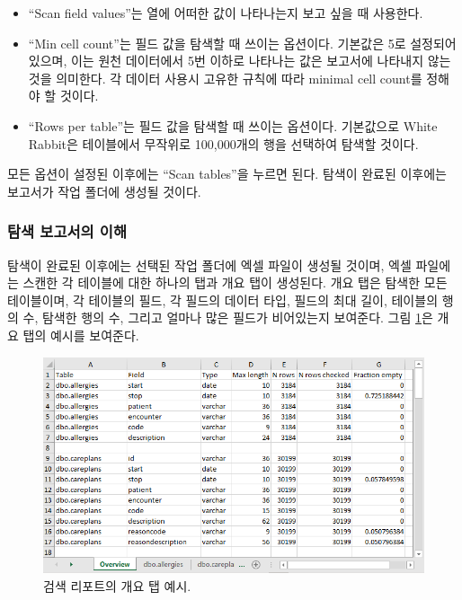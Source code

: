 \documentclass[10.5pt]{book}
\providecommand{\tightlist}{%
  \setlength{\itemsep}{0pt}\setlength{\parskip}{0pt}}
\theoremstyle{definition}
\theoremstyle{definition}
\theoremstyle{definition}
\theoremstyle{remark}
\begin{document}
\begin{itemize}
\tightlist
\item
  ``Scan field values''는 열에 어떠한 값이 나타나는지 보고 싶을 때
  사용한다.
\item
  ``Min cell count''는 필드 값을 탐색할 때 쓰이는 옵션이다. 기본값은 5로
  설정되어 있으며, 이는 원천 데이터에서 5번 이하로 나타나는 값은
  보고서에 나타내지 않는 것을 의미한다. 각 데이터 사용시 고유한 규칙에
  따라 minimal cell count를 정해야 할 것이다.
\item
  ``Rows per table''는 필드 값을 탐색할 때 쓰이는 옵션이다. 기본값으로
  White Rabbit은 테이블에서 무작위로 100,000개의 행을 선택하여 탐색할
  것이다.
\end{itemize}

모든 옵션이 설정된 이후에는 ``Scan tables''을 누르면 된다. 탐색이 완료된
이후에는 보고서가 작업 폴더에 생성될 것이다.

\subsubsection*{탐색 보고서의 이해}\label{--}

탐색이 완료된 이후에는 선택된 작업 폴더에 엑셀 파일이 생성될 것이며,
엑셀 파일에는 스캔한 각 테이블에 대한 하나의 탭과 개요 탭이 생성된다.
개요 탭은 탐색한 모든 테이블이며, 각 테이블의 필드, 각 필드의 데이터
타입, 필드의 최대 길이, 테이블의 행의 수, 탐색한 행의 수, 그리고 얼마나
많은 필드가 비어있는지 보여준다. 그림 \ref{fig:ScanOverviewTab}은 개요
탭의 예시를 보여준다.

\begin{figure}

{\centering \includegraphics[width=1\linewidth]{images/ExtractTransformLoad/ScanOverviewTab} 

}

\caption{검색 리포트의 개요 탭 예시.}\label{fig:ScanOverviewTab}
\end{figure}
\end{document}
